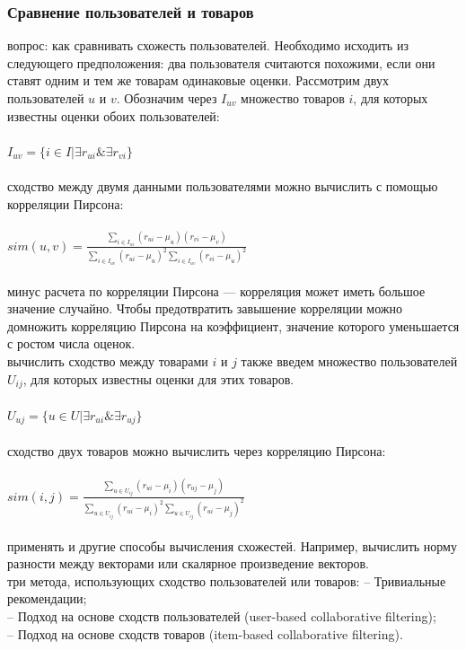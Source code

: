 \documentclass{article}
\newcommand\tab[1][1cm]{\hspace*{#1}}
\begin{document}
\subsubsection{Сравнение пользователей и товаров}
 вопрос: как сравнивать схожесть пользователей. Необходимо исходить из следующего предположения: два пользователя считаются похожими, если они ставят одним и тем же товарам одинаковые оценки. Рассмотрим двух пользователей ﻿$u$﻿ и ﻿$v$﻿. Обозначим через ﻿$I_{uv}$ множество товаров ﻿$i$, для которых известны оценки обоих пользователей:\\
\\
\tab$I_{uv}=\{ i\in I | \exists r_{ui} \& \exists r_{vi}\}$\\
\\
 сходство между двумя данными пользователями можно вычислить с помощью корреляции Пирсона:\\
\\
\tab$sim(u,v)=\frac{\sum_{i\in I_{ui}}{(r_{ui}-\mu_u)(r_{vi}-\mu_v)}}{\sum_{i\in I_{uv}}{(r_{ui}-\mu_u)^2}\sum_{i\in I_{uv}}{(r_{vi}-\mu_u)^2}}$\\
\\
 минус расчета по корреляции Пирсона —  корреляция может иметь большое значение случайно. Чтобы предотвратить завышение корреляции можно домножить корреляцию Пирсона на коэффициент, значение которого уменьшается с ростом числа оценок.\\
 вычислить сходство между товарами $i$﻿ и ﻿$j$﻿ также введем множество пользователей ﻿$U_{ij}$﻿, для которых известны оценки для этих товаров.\\
\\
\tab$U_{uj}=\{u\in U|\exists r_{ui} \&\exists r_{uj}\}$\\
\\
 сходство двух товаров можно вычислить через корреляцию Пирсона:\\
\\
\tab$sim(i,j)=\frac{\sum_{u\in U_{ij}}{(r_{ui}-\mu_i)(r_{uj}-\mu_j)}}{\sum_{u\in U_{ij}}{(r_{ui}-\mu_i)^2}\sum_{u\in U_{ij}}{(r_{ui}-\mu_j)^2}}$\\
\\
 применять и другие способы вычисления схожестей. Например, вычислить норму разности между векторами или скалярное произведение векторов.\\
 три метода, использующих сходство пользователей или товаров:
\tab– Тривиальные рекомендации;\\
\tab– Подход на основе сходств пользователей (user-based collaborative filtering);\\
\tab– Подход на основе сходств товаров (item-based collaborative filtering).
\end{document}
